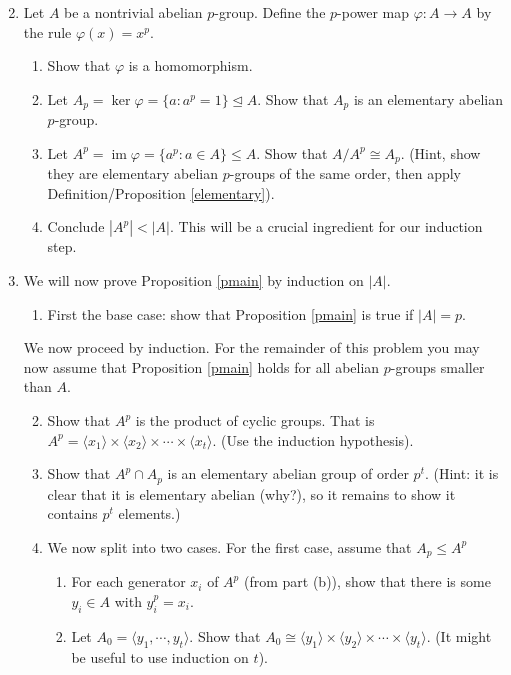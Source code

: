 \documentclass[11pt]{article}
\newcommand{\la}{\langle}
\newcommand{\ra}{\rangle}
\newcommand{\im}{\operatorname{im}}
\begin{document}
\begin{enumerate}
  \setcounter{enumi}{1}
  \item{
  Let $A$ be a nontrivial abelian $p$-group.  Define the $p$-power map $\varphi:A\to A$ by the rule $\varphi(x) = x^p$.
  \begin{enumerate}
    \item{
    Show that $\varphi$ is a homomorphism.
    }
    \item{
    Let $A_p = \ker\varphi = \{a:a^p = 1\}\unlhd A$.  Show that $A_p$ is an elementary abelian $p$-group.
    }
    \item{
    Let $A^p = \im\varphi = \{a^p: a\in A\}\le A$.  Show that $A/A^p\cong A_p$.  (Hint, show they are elementary abelian $p$-groups of the same order, then apply Definition/Proposition \ref{elementary}).
    }
    \item{
    Conclude $|A^p|<|A|$.  This will be a crucial ingredient for our induction step.
    }
  \end{enumerate}
  }
  \item{
  We will now prove Proposition \ref{pmain} by induction on $|A|$.
  \begin{enumerate}
    \item{
    First the base case: show that Proposition \ref{pmain} is true if $|A| = p$.
    }
  \end{enumerate}
  We now proceed by induction.  For the remainder of this problem you may now assume that Proposition \ref{pmain} holds for all abelian $p$-groups smaller than $A$.
  \begin{enumerate}
    \setcounter{enumii}{1}
    \item{
    Show that $A^p$ is the product of cyclic groups.  That is $A^p = \la x_1\ra\times\la x_2\ra\times\cdots\times\la x_t\ra$. (Use the induction hypothesis).
    }
    \item{
    Show that $A^p\cap A_p$ is an elementary abelian group of order $p^t$.  (Hint: it is clear that it is elementary abelian (why?), so it remains to show it contains $p^t$ elements.)
    }
    \item{
    We now split into two cases.  For the first case, assume that $A_p\le A^p$
    \begin{enumerate}
      \item{
      For each generator $x_i$ of $A^p$ (from part (b)), show that there is some $y_i\in A$ with $y_i^p = x_i$.
      }
      \item{
      Let $A_0 = \la y_1,\cdots,y_t\ra$.  Show that $A_0\cong\la y_1\ra\times\la y_2\ra\times\cdots\times\la y_t\ra$.  (It might be useful to use induction on $t$).
}
\end{enumerate}}
\end{enumerate}}
\end{enumerate}
\end{document}
